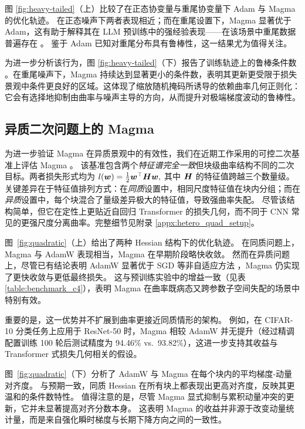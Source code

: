 \documentclass[11pt, a4paper, twocolumn, copyright, goog]{google}
\theoremstyle{plain}
\theoremstyle{definition}
\theoremstyle{remark}
\begin{document}
图 \ref{fig:heavy-tailed}（上）比较了在正态协变量与重尾协变量下 Adam 与 Magma 的优化轨迹。 
在正态噪声下两者表现相近；而在重尾设置下，Magma 显著优于 Adam，这有助于解释其在 LLM 预训练中的强经验表现——在该场景中重尾数据普遍存在 \citep{kunstner2024heavy,ahn2023linear}。 
鉴于 Adam 已知对重尾分布具有鲁棒性，这一结果尤为值得关注。


为进一步分析该行为，图 \ref{fig:heavy-tailed}（下）报告了训练轨迹上的鲁棒条件数 \citep{jiang2023does}。在重尾噪声下，Magma 持续达到显著更小的条件数，表明其更新更受限于损失景观中条件更良好的区域。这体现了缩放随机掩码所诱导的依赖曲率几何正则化：它会有选择地抑制由曲率与噪声主导的方向，从而提升对极端梯度波动的鲁棒性。



\subsection{异质二次问题上的 Magma}
为进一步验证 Magma 在异质景观中的有效性，我们在近期工作采用的可控二次基准上评估 Magma \citep{zhang2024transformers, orvieto2025search}。
该基准包含两个\emph{特征谱完全一致}但块级曲率结构不同的二次目标。两者损失形式均为 $l({\bm{w}}) = \tfrac{1}{2} {\bm{w}}^\top {\bm{H}} {\bm{w}},$ 其中 ${\bm{H}}$ 的特征值跨越三个数量级。关键差异在于特征值排列方式：在\emph{同质}设置中，相同尺度特征值在块内分组；而在\emph{异质}设置中，每个块混合了量级差异极大的特征值，导致强曲率失配。 
尽管该结构简单，但它在定性上更贴近自回归 Transformer 的损失几何，而不同于 CNN 常见的更强尺度分离曲率。完整细节见附录 \ref{appx:hetero_quad_setup}。



图~\ref{fig:quadratic}（上）给出了两种 Hessian 结构下的优化轨迹。
在同质问题上，Magma 与 AdamW 表现相当，Magma 在早期阶段略快收敛。  
然而在异质问题上，尽管已有结论表明 AdamW 显著优于 SGD 等非自适应方法 \citep{zhang2024transformers,orvieto2025search}，Magma 仍实现了更快收敛与更低最终损失。  
这与预训练实验中的增益一致（见表 \ref{table:benchmark_c4}），表明 Magma 在曲率既病态又跨参数子空间失配的场景中特别有效。

重要的是，这一优势并不扩展到曲率更接近同质情形的架构。 
例如，在 CIFAR-10 分类任务上应用于 ResNet-50 时，Magma 相较 AdamW 并无提升（经过精调配置训练 100 轮后测试精度为 94.46\% vs.\ 93.82\%），这进一步支持其收益与 Transformer 式损失几何相关的假设。


图~\ref{fig:quadratic}（下）分析了 AdamW 与 Magma 在每个块内的平均梯度-动量对齐度。  
与预期一致，同质 Hessian 在所有块上都表现出更高对齐度，反映其更温和的条件数特性。
值得注意的是，尽管 Magma 显式抑制与累积动量冲突的更新，它并未显著提高对齐分数本身。
这表明 Magma 的收益并非源于改变动量统计量，而是来自强化瞬时梯度与长期下降方向之间的一致性。
\end{document}
